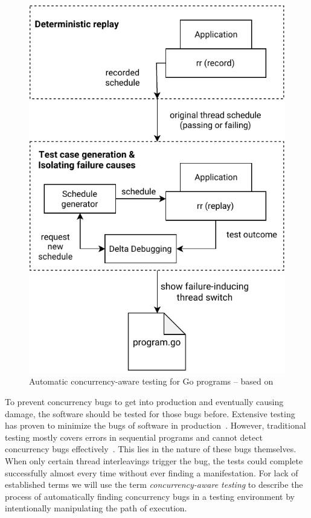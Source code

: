 \documentclass[conference]{IEEEtran}
\begin{document}
\begin{figure}
    \includegraphics[width=\linewidth]{figures/Concurrency-Testing.pdf}
    \caption{Automatic concurrency-aware testing for Go programs -- based on\cite{acm2002}}
    \label{fig:testing}
\end{figure}

To prevent concurrency bugs to get into production and eventually causing damage, the software should be tested for those bugs before.
Extensive testing has proven to minimize the bugs of software in production~\cite{makinen2014testing}.
However, traditional testing mostly covers errors in sequential programs and cannot detect concurrency bugs effectively~\cite{lu2008mistakes}.
This lies in the nature of these bugs themselves.
When only certain thread interleavings trigger the bug, the tests could complete successfully almost every time without ever finding a manifestation.
For lack of established terms we will use the term \emph{concurrency-aware testing} to describe the process of automatically finding concurrency bugs in a testing environment by intentionally manipulating the path of execution.
\end{document}

